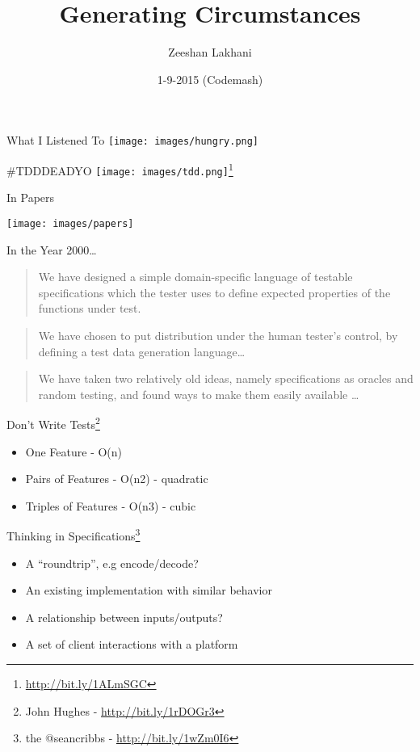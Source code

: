 \documentclass[presentation, bigger]{beamer}
\institute[]{Software Engineer at Basho Technologies,Inc | Founder/Organizer Papers We Love \\ @zeeshanlakhani}
\author{Zeeshan Lakhani}
\date{1-9-2015 (Codemash)}
\title{Generating Circumstances}
\begin{document}
\maketitle

\begin{frame}[label=sec-]{What I Listened To}
\texttt{[image: images/hungry.png]}
\end{frame}
\begin{frame}[label=sec-]{\#TDDDEADYO}
\texttt{[image: images/tdd.png]}\footnote{\url{http://bit.ly/1ALmSGC}}
\end{frame}
\begin{frame}[label=sec-]{In Papers}
\begin{center}
 \texttt{[image: images/papers]}
\end{center}
\end{frame}
\begin{frame}[label=sec-]{In the Year 2000\ldots{}}
\begin{quote}
We have designed a simple domain-specific language of testable specifications
which the tester uses to define expected properties of the functions under test.
\end{quote}

\begin{quote}
We have chosen to put distribution under the human tester's control, by
defining a test data generation language…
\end{quote}

\begin{quote}
We have taken two relatively old ideas, namely specifications as oracles and
random testing, and found ways to make them easily available …
\end{quote}
\end{frame}
\begin{frame}[label=sec-]{Don't Write Tests\footnote{John Hughes - \url{http://bit.ly/1rDOGr3}}}
\begin{itemize}
\item One Feature - O(n)
\item Pairs of Features - O(n2) - quadratic
\item Triples of Features - O(n3) - cubic
\end{itemize}
\end{frame}
\begin{frame}[label=sec-]{Thinking in Specifications\footnote{the @seancribbs - \url{http://bit.ly/1wZm0I6}}}
\begin{itemize}
\item A “roundtrip”, e.g encode/decode?
\item An existing implementation with similar behavior
\item A relationship between inputs/outputs?
\item A set of client interactions with a platform
\end{itemize}
\end{frame}
\end{document}
